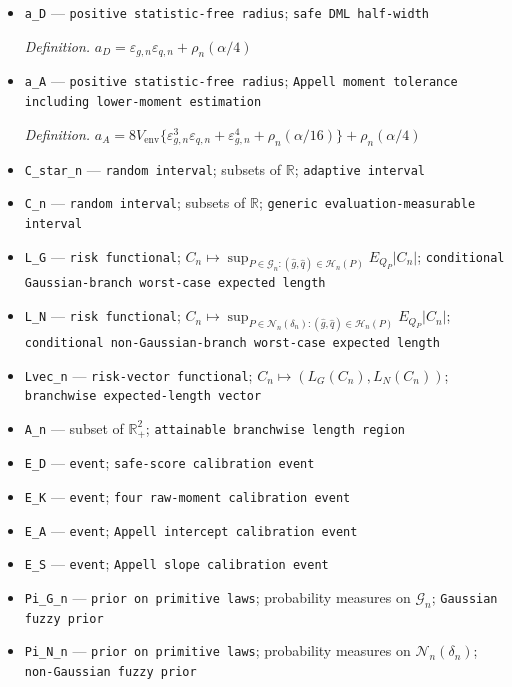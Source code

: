 \documentclass{article}
\begin{document}
\begin{itemize}
  \item \texttt{a\_\allowbreak{}D} --- \texttt{positive statistic-\allowbreak{}free radius}; \texttt{safe DML half-\allowbreak{}width}
  \par\smallskip\noindent\emph{Definition.} \(a_D=\varepsilon_{g,n}\varepsilon_{q,n}+\rho_n(\alpha/4)\)
  \item \texttt{a\_\allowbreak{}A} --- \texttt{positive statistic-\allowbreak{}free radius}; \texttt{Appell moment tolerance including lower-\allowbreak{}moment estimation}
  \par\smallskip\noindent\emph{Definition.} \(a_A=8V_{\mathrm{env}}\{\varepsilon_{g,n}^3\varepsilon_{q,n}+\varepsilon_{g,n}^4+\rho_n(\alpha/16)\}+\rho_n(\alpha/4)\)
  \item \texttt{C\_\allowbreak{}star\_\allowbreak{}n} --- \texttt{random interval}; subsets of \(\mathbb R\); \texttt{adaptive interval}
  \item \texttt{C\_\allowbreak{}n} --- \texttt{random interval}; subsets of \(\mathbb R\); \texttt{generic evaluation-\allowbreak{}measurable interval}
  \item \texttt{L\_\allowbreak{}G} --- \texttt{risk functional}; \(C_n\mapsto\sup_{P\in\mathcal G_n:(\widehat g,\widehat q)\in\mathcal H_n(P)}E_{Q_P}|C_n|\); \texttt{conditional Gaussian-\allowbreak{}branch worst-\allowbreak{}case expected length}
  \item \texttt{L\_\allowbreak{}N} --- \texttt{risk functional}; \(C_n\mapsto\sup_{P\in\mathcal N_n(\delta_n):(\widehat g,\widehat q)\in\mathcal H_n(P)}E_{Q_P}|C_n|\); \texttt{conditional non-\allowbreak{}Gaussian-\allowbreak{}branch worst-\allowbreak{}case expected length}
  \item \texttt{Lvec\_\allowbreak{}n} --- \texttt{risk-\allowbreak{}vector functional}; \(C_n\mapsto(L_G(C_n),L_N(C_n))\); \texttt{branchwise expected-\allowbreak{}length vector}
  \item \texttt{A\_\allowbreak{}n} --- subset of \(\mathbb R_+^2\); \texttt{attainable branchwise length region}
  \item \texttt{E\_\allowbreak{}D} --- \texttt{event}; \texttt{safe-\allowbreak{}score calibration event}
  \item \texttt{E\_\allowbreak{}K} --- \texttt{event}; \texttt{four raw-\allowbreak{}moment calibration event}
  \item \texttt{E\_\allowbreak{}A} --- \texttt{event}; \texttt{Appell intercept calibration event}
  \item \texttt{E\_\allowbreak{}S} --- \texttt{event}; \texttt{Appell slope calibration event}
  \item \texttt{Pi\_\allowbreak{}G\_\allowbreak{}n} --- \texttt{prior on primitive laws}; probability measures on \(\mathcal G_n\); \texttt{Gaussian fuzzy prior}
  \item \texttt{Pi\_\allowbreak{}N\_\allowbreak{}n} --- \texttt{prior on primitive laws}; probability measures on \(\mathcal N_n(\delta_n)\); \texttt{non-\allowbreak{}Gaussian fuzzy prior}
\end{itemize}
\end{document}
